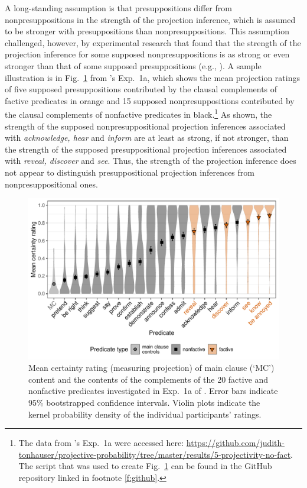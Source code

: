 \documentclass[11pt,fleqn]{article}
\newcommand{\6}{\mbox{$[\hspace*{-.6mm}[$}}
\newcommand{\9}{\mbox{$]\hspace*{-.6mm}]$}}
\newcommand{\citepos}[1]{\citeauthor{#1}'s \citeyear{#1}}
\begin{document}
A long-standing assumption is that presuppositions differ from nonpresuppositions in the strength of the projection inference, which is assumed to be stronger with presuppositions than nonpresuppositions. This assumption challenged, however, by experimental research that found that the strength of the projection inference for some supposed nonpresuppositions is as strong or even stronger than that of some supposed presuppositions (e.g., \citealt{demarneffe-etal-sub23,tbd-variability,degen-tonhauser-language}).  A sample illustration is in Fig.~\ref{fig:dt1a} from \citepos{degen-tonhauser-language} Exp.~1a, which shows the mean projection ratings of five supposed presuppositions contributed by the clausal complements of factive predicates in \color{orange}orange \color{black} and 15 supposed nonpresuppositions contributed by the clausal complements of nonfactive predicates in black.\footnote{The data from \citepos{degen-tonhauser-language} Exp.~1a were accessed here: \url{https://github.com/judith-tonhauser/projective-probability/tree/master/results/5-projectivity-no-fact}. The script that was used to create Fig.~\ref{fig:dt1a} can be found in the GitHub repository linked in footnote \ref{f:github}.} As shown, the strength of the supposed nonpresuppositional projection inferences associated with \emph{acknowledge, hear} and \emph{inform} are at least as strong, if not stronger, than the strength of the supposed presuppositional projection inferences associated with \emph{reveal, discover} and \emph{see}. Thus, the strength of the projection inference does not appear to distinguish presuppositional projection inferences from nonpresuppositional ones.

\begin{figure}[h!]
\centering
\includegraphics[width=.8\textwidth]{../../../results/main/graphs/mean-certainty-by-predicateType}
\caption{Mean certainty rating (measuring projection) of main clause (`MC') content and the contents of the complements of the 20 \color{orange}factive \color{black} and \color{black}nonfactive \color{black} predicates investigated in Exp.~1a of \citealt{degen-tonhauser-language}. Error bars indicate 95\% bootstrapped confidence intervals. Violin plots indicate the kernel probability density of the individual participants' ratings.}\label{fig:dt1a}
\end{figure}
\end{document}
